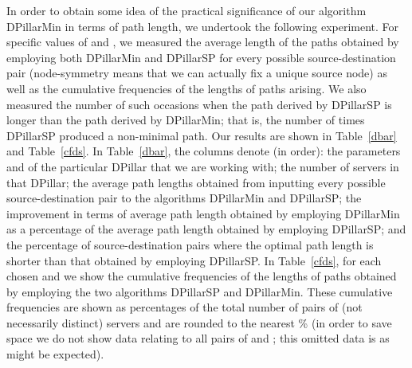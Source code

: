 \documentclass{article}
\begin{document}
In order to obtain some idea of the practical significance of our algorithm DPillarMin in terms of path length, we undertook the following experiment. For specific values of  and , we measured the average length of the paths obtained by employing both DPillarMin and DPillarSP for every possible source-destination pair (node-symmetry means that we can actually fix a unique source node) as well as the cumulative frequencies of the lengths of paths arising. We also measured the number of such occasions when the path derived by DPillarSP is longer than the path derived by DPillarMin; that is, the number of times DPillarSP produced a non-minimal path. Our results are shown in Table~\ref{dbar} and Table~\ref{cfds}. In Table~\ref{dbar}, the columns denote (in order): the parameters  and  of the particular DPillar that we are working with; the number of servers in that DPillar; the average path lengths obtained from inputting every possible source-destination pair to the algorithms DPillarMin and DPillarSP; the improvement in terms of average path length obtained by employing DPillarMin as a percentage of the average path length obtained by employing DPillarSP; and the percentage of source-destination pairs where the optimal path length is shorter than that obtained by employing DPillarSP. In Table~\ref{cfds}, for each chosen  and  we show the cumulative frequencies of the lengths of paths obtained by employing the two algorithms DPillarSP and DPillarMin. These cumulative frequencies are shown as percentages of the total number of pairs of (not necessarily distinct) servers and are rounded to the nearest \% (in order to save space we do not show data relating to all pairs of  and ; this omitted data is as might be expected).
\end{document}
